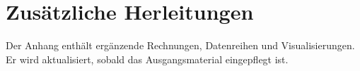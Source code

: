 \section{Zus\"atzliche Herleitungen}
Der Anhang enth\"alt erg\"anzende Rechnungen, Datenreihen und Visualisierungen.
Er wird aktualisiert, sobald das Ausgangsmaterial eingepflegt ist.
